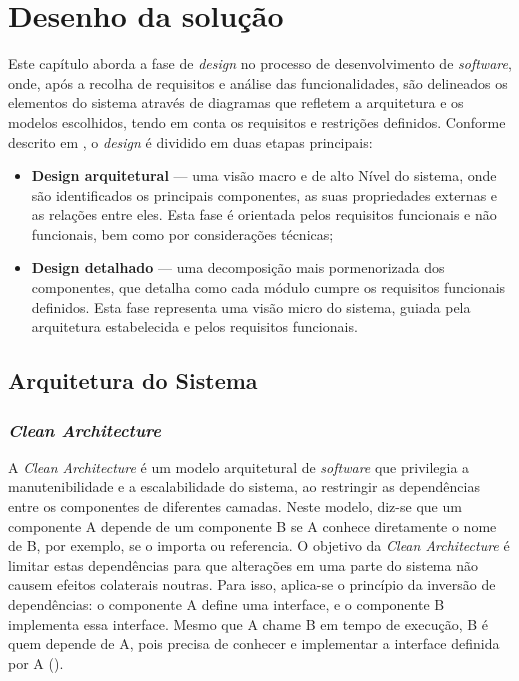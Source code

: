 
\chapter{Desenho da solução}
\label{chap:DS}

Este capítulo aborda a fase de \textit{design} no processo de desenvolvimento de \textit{software}, onde, após a recolha de requisitos e análise das funcionalidades, são delineados os elementos do sistema através de diagramas que refletem a arquitetura e os modelos escolhidos, tendo em conta os requisitos e restrições definidos. Conforme descrito em \cite{tsui2022essentials}, o \textit{design} é dividido em duas etapas principais:

\begin{itemize}
    \item \textbf{Design arquitetural} — uma visão macro e de alto Nível do sistema, onde são identificados os principais componentes, as suas propriedades externas e as relações entre eles. Esta fase é orientada pelos requisitos funcionais e não funcionais, bem como por considerações técnicas;
    \item \textbf{Design detalhado} — uma decomposição mais pormenorizada dos componentes, que detalha como cada módulo cumpre os requisitos funcionais definidos. Esta fase representa uma visão micro do sistema, guiada pela arquitetura estabelecida e pelos requisitos funcionais.
\end{itemize}


\section{Arquitetura do Sistema} 

\subsection{\textit{Clean Architecture}}

A \textit{Clean Architecture} é um modelo arquitetural de \textit{software} que privilegia a manutenibilidade e a escalabilidade do sistema, ao restringir as dependências entre os componentes de diferentes camadas. Neste modelo, diz-se que um componente A depende de um componente B se A conhece diretamente o nome de B, por exemplo, se o importa ou referencia. O objetivo da \textit{Clean Architecture} é limitar estas dependências para que alterações em uma parte do sistema não causem efeitos colaterais noutras. Para isso, aplica-se o princípio da inversão de dependências: o componente A define uma interface, e o componente B implementa essa interface. Mesmo que A chame B em tempo de execução, B é quem depende de A, pois precisa de conhecer e implementar a interface definida por A (\cite{Lano2023}).

